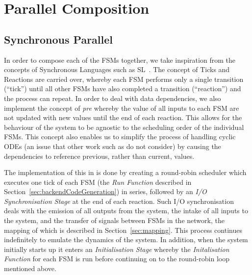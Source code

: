 \section{Parallel Composition}
\label{sec:composition}

\subsection{Synchronous Parallel}
\label{sec:synchronousParallel}

%  

In order to compose each of the \acp{FSM} together, we take inspiration
from the concepts of Synchronous Languages such as SL~\cite{SlLanguage}.  The 
concept of Ticks and Reactions are carried over, whereby each \ac{FSM} performs 
only a single transition (``tick'') until all other \acp{FSM} have also 
completed a transition (``reaction'') and the process can repeat.  In order to
deal with data dependencies, we also implement the concept of \emph{pre}
whereby the value of all inputs to each \ac{FSM} are not updated with
new values until the end of each reaction.  This allows for the behaviour of 
the system to be agnostic to the scheduling order of the individual 
\acp{FSM}.  This concept also enables us to simplify the process of 
handling cyclic \acp{ODE} (an issue that other work such as 
\cite{kim2003modular} do not consider) by causing the dependencies to reference
previous, rather than current, values.

The implementation of this in \ourTool is done by creating a round-robin
scheduler which executes one tick of each \ac{FSM} (the \emph{Run Function} 
described in Section~\ref{sec:backendCodeGeneration}) in series, followed by an 
\emph{I/O Synchronisation Stage} at the end of each reaction.  Such I/O 
synchronisation deals with the emission of all outputs from the system, the 
intake of all inputs to the system, and the transfer of signals between 
\acp{FSM} in the network, the mapping of which is described in  
Section~\ref{sec:mapping}.  This process continues indefinitely to emulate the 
dynamics of the system.  In addition, when the system initially starts up it 
enters an \emph{Initialisation Stage} whereby the \emph{Initalisation Function} 
for each \ac{FSM} is run before continuing on to the round-robin loop mentioned 
above.

